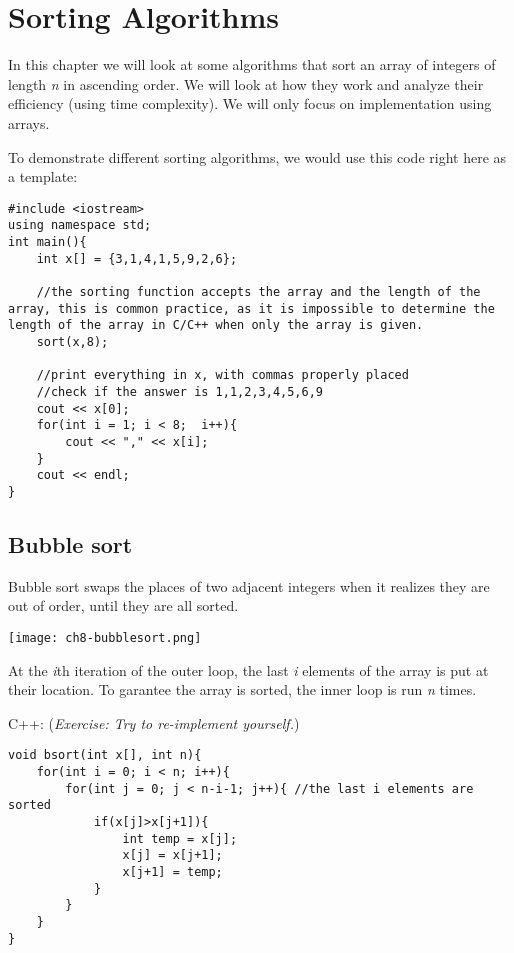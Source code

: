 \chapter{Sorting Algorithms}

In this chapter we will look at some algorithms that sort an array of integers of length \textit{n} in ascending order. We will look at how they work and analyze their efficiency (using time complexity). We will only focus on implementation using arrays.

To demonstrate different sorting algorithms, we would use this code right here as a template:

\begin{lstlisting}
#include <iostream>
using namespace std;
int main(){
    int x[] = {3,1,4,1,5,9,2,6};
    
    //the sorting function accepts the array and the length of the array, this is common practice, as it is impossible to determine the length of the array in C/C++ when only the array is given.
    sort(x,8);

    //print everything in x, with commas properly placed
    //check if the answer is 1,1,2,3,4,5,6,9
    cout << x[0];
    for(int i = 1; i < 8;  i++){
        cout << "," << x[i];
    }
    cout << endl;
}
\end{lstlisting}
\pagebreak
\section{Bubble sort}

Bubble sort swaps the places of two adjacent integers when it realizes they are out of order, until they are all sorted.

\texttt{[image: ch8-bubblesort.png]}

\pagebreak


\pagebreak

At the \textit{i}th iteration of the outer loop, the last \textit{i} elements of the array is put at their location. To garantee the array is sorted, the inner loop is run \textit{n} times.
\vspace{6mm}

C++: (\textit{Exercise: Try to re-implement yourself.})
\begin{lstlisting}
void bsort(int x[], int n){
    for(int i = 0; i < n; i++){
        for(int j = 0; j < n-i-1; j++){ //the last i elements are sorted
            if(x[j]>x[j+1]){
                int temp = x[j];
                x[j] = x[j+1];
                x[j+1] = temp;
            }
        } 
    }
}
\end{lstlisting}

